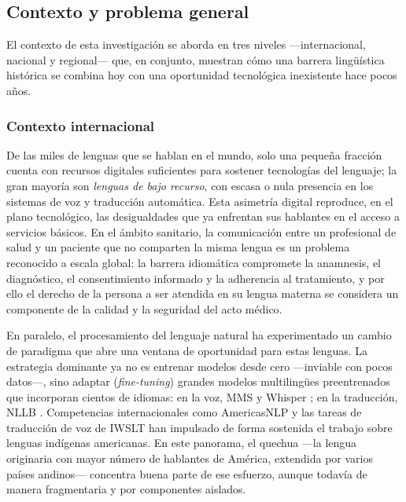 \documentclass[12pt,a4paper]{article}
\newcommand{\obsdos}[1]{\textcolor{verdeOK}{#1}}
\newenvironment{bloqueObsDos}{\par\color{verdeOK}}{\par}
\begin{document}
\subsection{Contexto y problema general}
\obsdos{El contexto de esta investigaci{\'o}n se aborda en tres niveles ---internacional, nacional y
regional--- que, en conjunto, muestran c{\'o}mo una barrera ling{\"u}{\'i}stica hist{\'o}rica se
combina hoy con una oportunidad tecnol{\'o}gica inexistente hace pocos a{\~n}os.}

\subsubsection{\obsdos{Contexto internacional}}
\begin{bloqueObsDos}
\noindent De las miles de lenguas que se hablan en el mundo, solo una peque{\~n}a fracci{\'o}n cuenta
con recursos digitales suficientes para sostener tecnolog{\'i}as del lenguaje; la gran mayor{\'i}a
son \emph{lenguas de bajo recurso}, con escasa o nula presencia en los sistemas de voz y
traducci{\'o}n autom{\'a}tica. Esta asimetr{\'i}a digital reproduce, en el plano tecnol{\'o}gico, las
desigualdades que ya enfrentan sus hablantes en el acceso a servicios b{\'a}sicos. En el {\'a}mbito
sanitario, la comunicaci{\'o}n entre un profesional de salud y un paciente que no comparten la misma
lengua es un problema reconocido a escala global: la barrera idiom{\'a}tica compromete la
anamnesis, el diagn{\'o}stico, el consentimiento informado y la adherencia al tratamiento, y por
ello el derecho de la persona a ser atendida en su lengua materna se considera un componente de la
calidad y la seguridad del acto m{\'e}dico.

\noindent En paralelo, el procesamiento del lenguaje natural ha experimentado un cambio de
paradigma que abre una ventana de oportunidad para estas lenguas. La estrategia dominante ya no es
entrenar modelos desde cero ---inviable con pocos datos---, sino adaptar (\emph{fine-tuning})
grandes modelos multiling{\"u}es preentrenados que incorporan cientos de idiomas: en la voz, MMS
\parencite{pratap2024mms} y Whisper \parencite{radford2023whisper}; en la traducci{\'o}n, NLLB
\parencite{costajussa2022nllb}. Competencias internacionales como AmericasNLP
\parencite{mager2021americasnlp} y las tareas de traducci{\'o}n de voz de IWSLT
\parencite{Ortega2025260} han impulsado de forma sostenida el trabajo sobre lenguas ind{\'i}genas
americanas. En este panorama, el quechua ---la lengua originaria con mayor n{\'u}mero de hablantes
de Am{\'e}rica, extendida por varios pa{\'i}ses andinos--- concentra buena parte de ese esfuerzo,
aunque todav{\'i}a de manera fragmentaria y por componentes aislados.


\end{bloqueObsDos}
\end{document}
